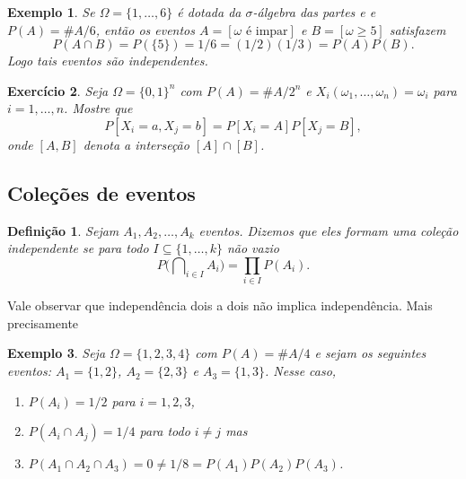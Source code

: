 \documentclass[reqno, draft]{book}
\newcommand*\1{\mathds{1}}
\newtheorem{definition}[theorem]{Definição}
\newtheorem{example}{Exemplo}[section]
\newtheorem{exercise}[example]{Exercício}
\DeclareMathOperator*{\mcap}{{\textstyle \bigcap}}
\begin{document}
\begin{example}
  Se $\Omega = \{1, \dots, 6\}$ é dotada da $\sigma$-álgebra das partes e e $P(A) = \#A/6$, então os eventos $A = [\omega \text{ é impar}]$ e $B = [\omega \geq 5]$ satisfazem
  \begin{equation}
    P(A \cap B) = P(\{5\}) = 1/6 = (1/2) (1/3) = P(A) P(B).
  \end{equation}
  Logo tais eventos são independentes.
\end{example}


\begin{exercise}
  Seja $\Omega = \{0,1\}^n$ com $P(A) = \#A/2^n$ e $X_i(\omega_1, \dots, \omega_n) = \omega_i$ para $i = 1, \dots, n$.
  Mostre que
  \begin{equation}
    P[X_i = a, X_j = b] = P[X_i = A] P[X_j = B],
  \end{equation}
  onde $[A,B]$ denota a interseção $[A] \cap [B]$.
\end{exercise}

\subsection{Coleções de eventos}

\begin{definition}
  Sejam $A_1, A_2, \dots, A_k$ eventos.
  Dizemos que eles formam uma coleção independente  se para todo $I \subseteq \{1, \dots, k\}$ não vazio
  \begin{equation}
    P\big( \mcap\nolimits_{i \in I} A_i \big) =  \prod\limits_{i \in I} P(A_i).
  \end{equation}
\end{definition}

Vale observar que independência dois a dois não implica independência.
Mais precisamente
\begin{example}
  Seja $\Omega = \{1,2,3,4\}$ com $P(A) = \# A/4$ e sejam os seguintes eventos: $A_1 = \{1,2\}$, $A_2 = \{2,3\}$ e $A_3 = \{1,3\}$.
  Nesse caso,
  \begin{enumerate}[\quad a)]
  \item $P(A_i) = 1/2$ para $i = 1, 2, 3$,
  \item $P(A_i \cap A_j) = 1/4$ para todo $i \neq j$ mas
  \item $P(A_1 \cap A_2 \cap A_3) = 0 \neq 1/8 = P(A_1) P(A_2) P(A_3)$.
  \end{enumerate}
\end{example}
\end{document}
